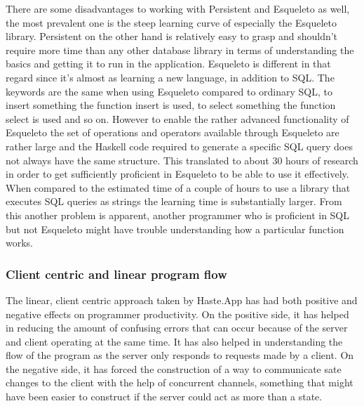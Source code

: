\documentclass[a4paper]{article}
\begin{document}
There are some disadvantages to working with Persistent and Esqueleto as well, the most prevalent one is the steep learning curve of especially the Esqueleto library. Persistent on the other hand is relatively easy to grasp and shouldn't require more time than any other database library in terms of understanding the basics and getting it to run in the application. Esqueleto is different in that regard since it's almost as learning a new language, in addition to SQL. The keywords are the same when using Esqueleto compared to ordinary SQL, to insert something the function insert is used, to select something the function select is used and so on. However to enable the rather advanced functionality of Esqueleto the set of operations and operators available through Esqueleto are rather large and the Haskell code required to generate a specific SQL query does not always have the same structure. This translated to about 30 hours of research in order to get sufficiently proficient in Esqueleto to be able to use it effectively. When compared to the estimated time of a couple of hours to use a library that executes SQL queries as strings the learning time is substantially larger. From this another problem is apparent, another programmer who is proficient in SQL but not Esqueleto might have trouble understanding how a particular function works.





\subsubsection{Client centric and linear program flow}
The linear, client centric approach taken by Haste.App has had both positive and negative effects on programmer productivity. On the positive side, it has helped in reducing the amount of confusing errors that can occur because of the server and client operating at the same time. It has also helped in understanding the flow of the program as the server only responds to requests made by a client. On the negative side, it has forced the construction of a way to communicate sate changes to the client with the help of concurrent channels, something that might have been easier to construct if the server could act as more than a state. 
\end{document}
